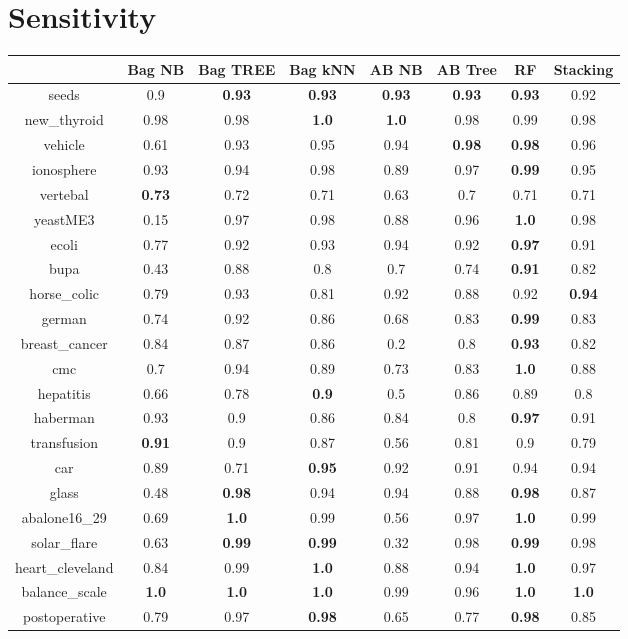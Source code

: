\documentclass{article}%
\begin{document}
%
\section*{Sensitivity}%
\begin{tabular}{c|ccccccc}%
&Bag NB&Bag TREE&Bag kNN&AB NB&AB Tree&RF&Stacking\\%
\hline%
seeds&0.9&\textbf{0.93}&\textbf{0.93}&\textbf{0.93}&\textbf{0.93}&\textbf{0.93}&0.92\\%
new\_thyroid&0.98&0.98&\textbf{1.0}&\textbf{1.0}&0.98&0.99&0.98\\%
vehicle&0.61&0.93&0.95&0.94&\textbf{0.98}&\textbf{0.98}&0.96\\%
ionosphere&0.93&0.94&0.98&0.89&0.97&\textbf{0.99}&0.95\\%
vertebal&\textbf{0.73}&0.72&0.71&0.63&0.7&0.71&0.71\\%
yeastME3&0.15&0.97&0.98&0.88&0.96&\textbf{1.0}&0.98\\%
ecoli&0.77&0.92&0.93&0.94&0.92&\textbf{0.97}&0.91\\%
bupa&0.43&0.88&0.8&0.7&0.74&\textbf{0.91}&0.82\\%
horse\_colic&0.79&0.93&0.81&0.92&0.88&0.92&\textbf{0.94}\\%
german&0.74&0.92&0.86&0.68&0.83&\textbf{0.99}&0.83\\%
breast\_cancer&0.84&0.87&0.86&0.2&0.8&\textbf{0.93}&0.82\\%
cmc&0.7&0.94&0.89&0.73&0.83&\textbf{1.0}&0.88\\%
hepatitis&0.66&0.78&\textbf{0.9}&0.5&0.86&0.89&0.8\\%
haberman&0.93&0.9&0.86&0.84&0.8&\textbf{0.97}&0.91\\%
transfusion&\textbf{0.91}&0.9&0.87&0.56&0.81&0.9&0.79\\%
car&0.89&0.71&\textbf{0.95}&0.92&0.91&0.94&0.94\\%
glass&0.48&\textbf{0.98}&0.94&0.94&0.88&\textbf{0.98}&0.87\\%
abalone16\_29&0.69&\textbf{1.0}&0.99&0.56&0.97&\textbf{1.0}&0.99\\%
solar\_flare&0.63&\textbf{0.99}&\textbf{0.99}&0.32&0.98&\textbf{0.99}&0.98\\%
heart\_cleveland&0.84&0.99&\textbf{1.0}&0.88&0.94&\textbf{1.0}&0.97\\%
balance\_scale&\textbf{1.0}&\textbf{1.0}&\textbf{1.0}&0.99&0.96&\textbf{1.0}&\textbf{1.0}\\%
postoperative&0.79&0.97&\textbf{0.98}&0.65&0.77&\textbf{0.98}&0.85\\%
\end{tabular}
\end{document}
